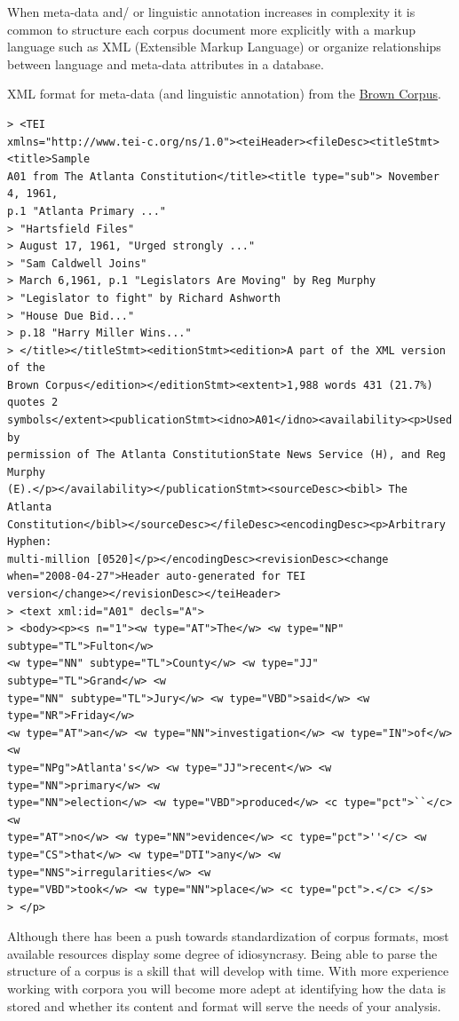 \documentclass[
  letterpaper,
]{latex/krantz}
\begin{document}
When meta-data and/ or linguistic annotation increases in complexity it
is common to structure each corpus document more explicitly with a
markup language such as XML (Extensible Markup Language) or organize
relationships between language and meta-data attributes in a database.

XML format for meta-data (and linguistic annotation) from the
\href{http://www.nltk.org/nltk_data/}{Brown Corpus}.

\begin{verbatim}
> <TEI
xmlns="http://www.tei-c.org/ns/1.0"><teiHeader><fileDesc><titleStmt><title>Sample
A01 from The Atlanta Constitution</title><title type="sub"> November 4, 1961,
p.1 "Atlanta Primary ..."
> "Hartsfield Files"
> August 17, 1961, "Urged strongly ..."
> "Sam Caldwell Joins"
> March 6,1961, p.1 "Legislators Are Moving" by Reg Murphy
> "Legislator to fight" by Richard Ashworth
> "House Due Bid..."
> p.18 "Harry Miller Wins..."
> </title></titleStmt><editionStmt><edition>A part of the XML version of the
Brown Corpus</edition></editionStmt><extent>1,988 words 431 (21.7%) quotes 2
symbols</extent><publicationStmt><idno>A01</idno><availability><p>Used by
permission of The Atlanta ConstitutionState News Service (H), and Reg Murphy
(E).</p></availability></publicationStmt><sourceDesc><bibl> The Atlanta
Constitution</bibl></sourceDesc></fileDesc><encodingDesc><p>Arbitrary Hyphen:
multi-million [0520]</p></encodingDesc><revisionDesc><change
when="2008-04-27">Header auto-generated for TEI
version</change></revisionDesc></teiHeader>
> <text xml:id="A01" decls="A">
> <body><p><s n="1"><w type="AT">The</w> <w type="NP" subtype="TL">Fulton</w>
<w type="NN" subtype="TL">County</w> <w type="JJ" subtype="TL">Grand</w> <w
type="NN" subtype="TL">Jury</w> <w type="VBD">said</w> <w type="NR">Friday</w>
<w type="AT">an</w> <w type="NN">investigation</w> <w type="IN">of</w> <w
type="NPg">Atlanta's</w> <w type="JJ">recent</w> <w type="NN">primary</w> <w
type="NN">election</w> <w type="VBD">produced</w> <c type="pct">``</c> <w
type="AT">no</w> <w type="NN">evidence</w> <c type="pct">''</c> <w
type="CS">that</w> <w type="DTI">any</w> <w type="NNS">irregularities</w> <w
type="VBD">took</w> <w type="NN">place</w> <c type="pct">.</c> </s>
> </p>
\end{verbatim}

Although there has been a push towards standardization of corpus
formats, most available resources display some degree of idiosyncrasy.
Being able to parse the structure of a corpus is a skill that will
develop with time. With more experience working with corpora you will
become more adept at identifying how the data is stored and whether its
content and format will serve the needs of your analysis.
\end{document}
